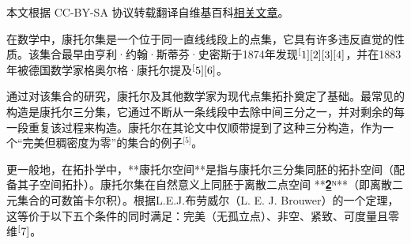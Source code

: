 
本文根据 CC-BY-SA 协议转载翻译自维基百科\href{https://en.wikipedia.org/wiki/Cantor_set}{相关文章}。

在数学中，康托尔集是一个位于同一直线线段上的点集，它具有许多违反直觉的性质。该集合最早由亨利·约翰·斯蒂芬·史密斯于1874年发现\(^\text[1][2][3][4]\)，并在1883年被德国数学家格奥尔格·康托尔提及\(^\text[5][6]\)。

通过对该集合的研究，康托尔及其他数学家为现代点集拓扑奠定了基础。最常见的构造是康托尔三分集，它通过不断从一条线段中去除中间三分之一，并对剩余的每一段重复该过程来构造。康托尔在其论文中仅顺带提到了这种三分构造，作为一个“完美但稠密度为零”的集合的例子\(^\text{[5]}\)。

更一般地，在拓扑学中，**康托尔空间**是指与康托尔三分集同胚的拓扑空间（配备其子空间拓扑）。康托尔集在自然意义上同胚于离散二点空间
**𝟐̲ᴺ**（即离散二元集合的可数笛卡尔积）。根据L.E.J.布劳威尔（L. E. J. Brouwer）的一个定理，这等价于以下五个条件的同时满足：完美（无孤立点）、非空、紧致、可度量且零维\(^\text[7]\)。


